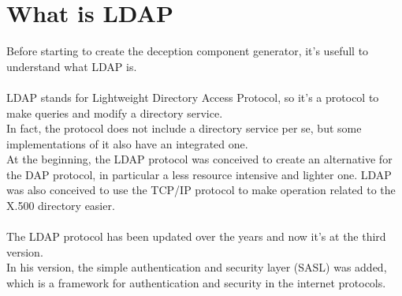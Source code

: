 \chapter{What is LDAP}
Before starting to create the deception component generator, it's usefull to understand what LDAP is.
\\\\
LDAP \cite{ldap} stands for Lightweight Directory Access Protocol, so it’s a protocol to make queries and modify a directory service.  
\\
In fact, the protocol does not include a directory service per se, but some implementations of it also have an integrated one. 
\\
At the beginning, the LDAP protocol was conceived to create an alternative for the DAP protocol, in particular a less resource intensive and lighter one. LDAP was also conceived to use the TCP/IP protocol to make operation related to the X.500 directory easier.  
\\\\
The LDAP protocol has been updated over the years and now it’s at the third version. 
\\
In his version, the simple authentication and security layer (SASL) was added, which is a framework for authentication and security in the internet protocols. 
